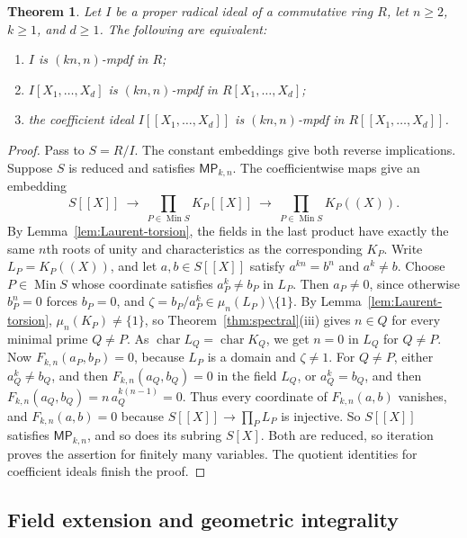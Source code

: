 \documentclass[11pt,a4paper]{amsart}
\newtheorem{theorem}{Theorem}[section]
\theoremstyle{definition}
\theoremstyle{remark}
\newcommand{\MP}[2]{\mathsf{MP}_{#1,#2}}
\numberwithin{equation}{section}
\begin{document}
\begin{theorem}\label{thm:series}
Let $I$ be a proper radical ideal of a commutative ring $R$, let
$n\ge2$, $k\ge1$, and $d\ge1$.  The following are equivalent:
\begin{enumerate}
\item $I$ is $(kn,n)$-mpdf in $R$;
\item $I[X_1,\ldots,X_d]$ is $(kn,n)$-mpdf in
$R[X_1,\ldots,X_d]$;
\item the coefficient ideal $I[[X_1,\ldots,X_d]]$ is
$(kn,n)$-mpdf in $R[[X_1,\ldots,X_d]]$.
\end{enumerate}
\end{theorem}
\begin{proof}
Pass to $S=R/I$.  The constant embeddings give both reverse
implications.  Suppose $S$ is reduced and satisfies
$\MP{k}{n}$.  The coefficientwise maps give an embedding
\[
 S[[X]]\ \longrightarrow\
 \prod_{P\in\operatorname{Min}S}K_P[[X]]\ \longrightarrow\
 \prod_{P\in\operatorname{Min}S}K_P((X)).
\]
By Lemma~\ref{lem:Laurent-torsion}, the fields in the last product
have exactly the same $n$th roots of unity and characteristics as
the corresponding $K_P$.  Write $L_P=K_P((X))$, and let $a,b\in S[[X]]$ satisfy $a^{kn}=b^n$ and $a^k\ne b$.
Choose $P\in\operatorname{Min}S$ whose coordinate satisfies $a_P^k\ne b_P$ in $L_P$.
Then $a_P\ne0$, since otherwise $b_P^n=0$ forces $b_P=0$, and
$\zeta=b_P/a_P^k\in\mu_n(L_P)\setminus\{1\}$.
By Lemma~\ref{lem:Laurent-torsion}, $\mu_n(K_P)\ne\{1\}$, so
Theorem~\ref{thm:spectral}(iii) gives $n\in Q$ for every minimal prime $Q\ne P$.
As $\operatorname{char}L_Q=\operatorname{char}K_Q$, we get $n=0$ in $L_Q$ for $Q\ne P$.
Now $F_{k,n}(a_P,b_P)=0$, because $L_P$ is a domain and $\zeta\ne1$.
For $Q\ne P$, either $a_Q^k\ne b_Q$, and then $F_{k,n}(a_Q,b_Q)=0$ in the field $L_Q$,
or $a_Q^k=b_Q$, and then $F_{k,n}(a_Q,b_Q)=n\,a_Q^{k(n-1)}=0$.
Thus every coordinate of $F_{k,n}(a,b)$ vanishes, and $F_{k,n}(a,b)=0$ because
$S[[X]]\to\prod_PL_P$ is injective.
So $S[[X]]$ satisfies $\MP{k}{n}$, and so does its subring $S[X]$.
Both are reduced, so iteration proves the assertion for finitely
many variables.  The quotient identities for coefficient ideals
finish the proof.
\end{proof}

\subsection{Field extension and geometric integrality}
\end{document}

